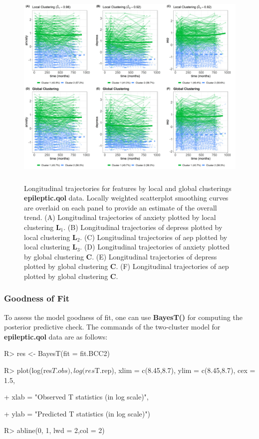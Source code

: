 \begin{figure}[h]
\centering
\includegraphics[width=\textwidth,height=10cm]{./Figures/trajplot.JPEG}
\caption{\label{fig:traj_epileptic_qol} Longitudinal trajectories for features by local and global clusterings \textbf{epileptic.qol} data. Locally weighted scatterplot smoothing curves are overlaid on each panel to provide an estimate of the overall trend. (A) Longitudinal trajectories of anxiety plotted by local clustering $\boldsymbol{L}_1$. (B) Longitudinal trajectories of depress plotted by local clustering $\boldsymbol{L}_2$. (C) Longitudinal trajectories of aep plotted by local clustering $\boldsymbol{L}_3$. (D) Longitudinal trajectories of anxiety plotted by global clustering $\boldsymbol{C}$. (E)  Longitudinal trajectories of depress plotted by global clustering $\boldsymbol{C}$. (F)  Longitudinal trajectories of aep plotted by global clustering $\boldsymbol{C}$.}
\end{figure}

\subsubsection{Goodness of Fit}

To assess the model goodness of fit, one can use \textbf{BayesT()} for computing the posterior predictive check. The commands of the two-cluster model for \textbf{epileptic.qol} data are as follows: 

\begin{example}

R> res <- BayesT(fit = fit.BCC2)

R> plot(log(res$T.obs), log(res$T.rep), xlim = c(8.45,8.7), ylim = c(8.45,8.7), cex = 1.5,

+        xlab = "Observed T statistics (in log scale)", 

+        ylab = "Predicted T statistics (in log scale)")

R> abline(0, 1, lwd = 2,col = 2)

\end{example} 

